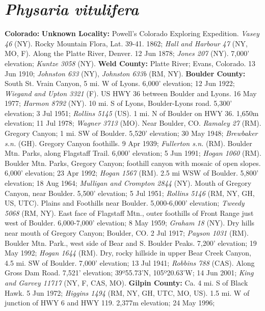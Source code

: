 \section*{\textit{Physaria vitulifera}}

  \textbf{Colorado:}
  \textbf{Unknown Locality:}
Powell's Colorado Exploring Expedition. \textit{Vasey 46} (NY).
Rocky Mountain Flora, Lat. 39-41. 1862; \textit{Hall and Harbour 47} (NY, MO, F).
Along the Platte River, Denver. 12 Jun 1878; \textit{Jones 207} (NY).
7,000' elevation; \textit{Kuntze 3058} (NY).
  \textbf{Weld County:}
Platte River; Evans, Colorado. 13 Jun 1910; \textit{Johnston 633} (NY),
\textit{Johnston 633b} (RM, NY).
  \textbf{Boulder County:}
South St. Vrain Canyon, 5 mi. W of Lyons. 6,000' elevation; 12 Jun 1922;
\textit{Wiegand and Upton 3321} (F).
US HWY 36 between Boulder and Lyons. 16 May 1977; \textit{Harmon 8792} (NY).
10 mi. S of Lyons, Boulder-Lyons road. 5,300' elevation; 3 Jul 1951;
\textit{Rollins 5145} (US).
1 mi. N of Boulder on HWY 36. 1,650m elevation; 11 Jul 1978;
\textit{Wagner 3713} (MO).
Near Boulder, CO. \textit{Ramaley 27} (RM).
Gregory Canyon; 1 mi. SW of Boulder. 5,520' elevation; 30 May 1948;
\textit{Brewbaker s.n.} (GH).
Gregory Canyon foothills. 9 Apr 1939; \textit{Fullerton s.n.} (RM).
Boulder Mtn. Parks, along Flagstaff Trail. 6,000' elevation; 5 Jun 1991;
\textit{Hogan 1060} (RM).
Boulder Mtn. Parks, Gregory Canyon; foothill canyon with mosaic of open slopes.
6,000' elevation; 23 Apr 1992; \textit{Hogan 1567} (RM).
2.5 mi WSW of Boulder. 5,800' elevation; 18 Aug 1964;
\textit{Mulligan and Crompton 2844} (NY).
Mouth of Gregory Canyon, near Boulder. 5,500' elevation; 5 Jul 1951;
\textit{Rollins 5146} (RM, NY, GH, US, UTC).
Plains and Foothills near Boulder. 5,000-6,000' elevation;
\textit{Tweedy 5068} (RM, NY).
East face of Flagstaff Mtn., outer foothills of Front Range just west of Boulder.
6,000-7,000' elevation; 8 May 1959; \textit{Graham 18} (NY).
Dry hills near mouth of Gregory Canyon; Boulder, CO. 2 Jul 1917;
\textit{Payson 1031} (RM).
Boulder Mtn. Park., west side of Bear and S. Boulder Peaks. 7,200' elevation;
19 May 1992; \textit{Hogan 1644} (RM).
Dry, rocky hillside in upper Bear Creek Canyon, 4.5 mi. SW of Boulder.
7,000' elevation; 13 Jul 1941; \textit{Robbins 788} (CAS).
Along Gross Dam Road. 7,521' elevation; 39º55.73'N, 105º20.63'W;
14 Jun 2001; \textit{King and Garvey 11717} (NY, F, CAS, MO).
  \textbf{Gilpin County:}
Ca. 4 mi. S of Black Hawk. 5 Jun 1972;
\textit{Higgins 1494} (RM, NY, GH, UTC, MO, US).
1.5 mi. W of junction of HWY 6 and HWY 119. 2,377m elevation; 24 May 1996;
